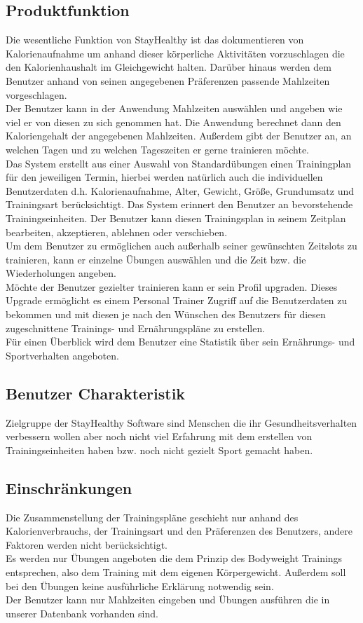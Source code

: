 \documentclass[12pt,a4paper,onecolumn]{article}
\begin{document}
\subsection{Produktfunktion}
Die wesentliche Funktion von StayHealthy ist das dokumentieren von Kalorienaufnahme um anhand dieser körperliche Aktivitäten vorzuschlagen die den Kalorienhaushalt im Gleichgewicht halten.
Darüber hinaus werden dem Benutzer anhand von seinen angegebenen Präferenzen passende Mahlzeiten vorgeschlagen.
\\Der Benutzer kann in der Anwendung Mahlzeiten auswählen und angeben wie viel er von diesen zu sich genommen hat. Die Anwendung berechnet dann den Kaloriengehalt der angegebenen Mahlzeiten. Außerdem gibt der Benutzer an, an welchen Tagen und zu welchen Tageszeiten er gerne trainieren möchte. 
\\Das System erstellt aus einer Auswahl von Standardübungen einen Trainingplan für den jeweiligen Termin, hierbei werden natürlich auch die individuellen Benutzerdaten d.h. Kalorienaufnahme, Alter, Gewicht, Größe, Grundumsatz und Trainingsart berücksichtigt. Das System erinnert den Benutzer an bevorstehende Trainingseinheiten. Der Benutzer kann diesen Trainingsplan in seinem Zeitplan bearbeiten, akzeptieren, ablehnen oder verschieben. \\Um dem Benutzer zu ermöglichen auch außerhalb seiner gewünschten Zeitslots zu trainieren, kann er einzelne Übungen auswählen und die Zeit bzw. die Wiederholungen angeben. \\
Möchte der Benutzer gezielter trainieren kann er sein Profil upgraden. Dieses Upgrade ermöglicht es einem Personal Trainer Zugriff auf die Benutzerdaten zu bekommen und mit diesen je nach den Wünschen des Benutzers für diesen zugeschnittene Trainings- und Ernährungspläne zu erstellen.\\
Für einen Überblick wird dem Benutzer eine Statistik über sein Ernährungs- und Sportverhalten angeboten.\\
\newpage
\subsection{Benutzer Charakteristik}
Zielgruppe der StayHealthy Software sind Menschen die ihr Gesundheitsverhalten verbessern wollen aber noch nicht viel Erfahrung mit dem erstellen von Trainingseinheiten haben bzw. noch nicht gezielt Sport gemacht haben.
\subsection{Einschränkungen}
Die Zusammenstellung der Trainingspläne geschieht nur anhand des Kalorienverbrauchs, der Trainingsart und den Präferenzen des Benutzers, andere Faktoren werden nicht berücksichtigt.
\\Es werden nur Übungen angeboten die dem Prinzip des Bodyweight Trainings entsprechen, also dem Training mit dem eigenen Körpergewicht. Außerdem soll bei den Übungen keine ausführliche Erklärung notwendig sein.\\
Der Benutzer kann nur Mahlzeiten eingeben und Übungen ausführen die in unserer Datenbank vorhanden sind.
\end{document}
